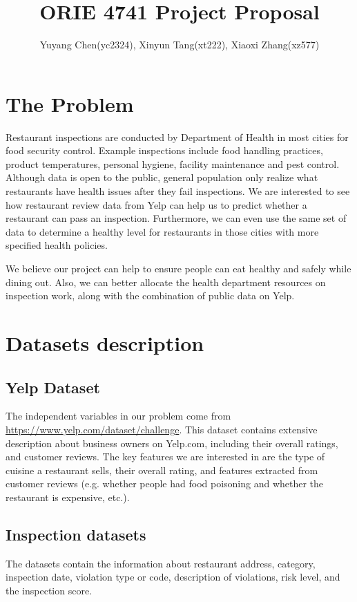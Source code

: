 \documentclass[12pt]{article}%
\begin{document}
\title{ORIE 4741 Project Proposal}
\author{Yuyang Chen(yc2324), Xinyun Tang(xt222), Xiaoxi Zhang(xz577)}
\date{}

\maketitle
\section{The Problem}
Restaurant inspections are conducted by Department of Health in most cities for food security control. Example inspections include food handling practices, product temperatures, personal hygiene, facility maintenance and pest control. Although data is open to the public, general population only realize what restaurants have health issues after they fail inspections. We are interested to see how restaurant review data from Yelp can help us to predict whether a restaurant can pass an inspection. Furthermore, we can even use the same set of data to determine a healthy level for restaurants in those cities with more specified health policies. 

We believe our project can help to ensure people can eat healthy and safely while dining out. Also, we can better allocate the health department resources on inspection work, along with the combination of public data on Yelp. 

\section{Datasets description}

\subsection{Yelp Dataset}
The independent variables in our problem come from \url{https://www.yelp.com/dataset/challenge}. This dataset contains extensive description about business owners on Yelp.com, including their overall ratings, and customer reviews. The key features we are interested in are the type of cuisine a restaurant sells, their overall rating, and features extracted from customer reviews (e.g. whether people had food poisoning and whether the restaurant is expensive, etc.).  
\subsection{Inspection datasets}
The datasets contain the information about restaurant address, category, inspection date, violation type or code, description of violations, risk level, and the inspection score.
\end{document}

